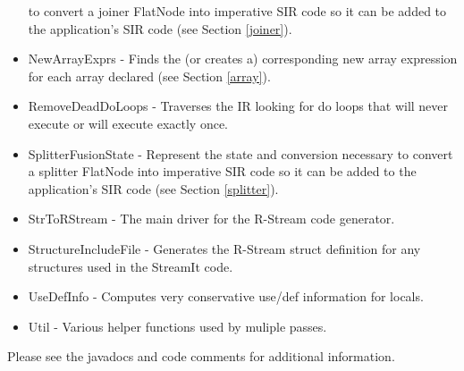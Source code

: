 \documentclass[10pt, letterpaper, onecolumn]{article}
\begin{document}
\begin{itemize}
to convert a joiner FlatNode into imperative SIR code so it can be
added to the application's SIR code (see Section \ref{joiner}).
\item NewArrayExprs - Finds the (or creates a) corresponding new array
expression for each array declared (see Section \ref{array}).
\item RemoveDeadDoLoops - Traverses the IR looking for do loops that
will never execute or will execute exactly once.
\item SplitterFusionState - Represent the state and conversion
necessary to convert a splitter FlatNode into imperative SIR code so
it can be added to the application's SIR code (see Section \ref{splitter}).
\item StrToRStream - The main driver for the R-Stream code generator.
\item StructureIncludeFile - Generates the R-Stream struct definition for any
structures used in the StreamIt code.
\item UseDefInfo - Computes very conservative use/def information for
  locals.
\item Util - Various helper functions used by muliple passes.
\end{itemize}

Please see the javadocs and code comments for additional information.
\end{document}
